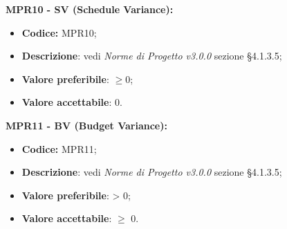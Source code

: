 \textbf{MPR10 - SV (Schedule Variance):}
\begin{itemize}
    \item \textbf{Codice:} MPR10;
    \item \textbf{Descrizione}: vedi \textit{Norme di Progetto v3.0.0} sezione \S 4.1.3.5;
    \item \textbf{Valore preferibile}: $\geq 0$;
    \item \textbf{Valore accettabile}: 0.
\end{itemize}
\textbf{MPR11 - BV (Budget Variance):}
\begin{itemize}
    \item \textbf{Codice:} MPR11;
    \item \textbf{Descrizione}: vedi \textit{Norme di Progetto v3.0.0} sezione \S 4.1.3.5;
    \item \textbf{Valore preferibile}: > 0;
    \item \textbf{Valore accettabile}: $\geq$ 0.
\end{itemize}
\newpage
